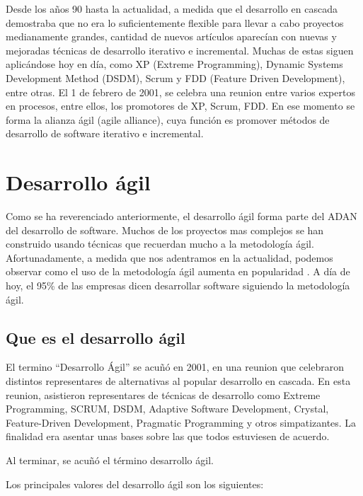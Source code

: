 \documentclass[12pt]{report} %
\begin{document}
Desde los años 90 hasta la actualidad, a medida que el desarrollo en cascada demostraba que no era lo suficientemente flexible para llevar a cabo proyectos medianamente grandes, cantidad de nuevos artículos aparecían con nuevas y mejoradas técnicas de desarrollo iterativo e incremental.
Muchas de estas siguen aplicándose hoy en día, como XP (Extreme Programming), Dynamic Systems Development Method (DSDM), Scrum y FDD (Feature Driven Development), entre otras.
El 1 de febrero de 2001, se celebra una reunion entre varios expertos en procesos, entre ellos, los promotores de XP, Scrum, FDD. 
En ese momento se forma la alianza ágil (agile alliance), cuya función es promover métodos de desarrollo de software iterativo e incremental. 

\section{Desarrollo ágil}

Como se ha reverenciado anteriormente, el desarrollo ágil forma parte del ADAN del desarrollo de software.
Muchos de los proyectos mas complejos se han construido usando técnicas que recuerdan mucho a la metodología ágil. \cite{GW-PM}
Afortunadamente, a medida que nos adentramos en la actualidad, podemos observar como el uso de la metodología ágil aumenta en popularidad \cite{Hoyada}.
A día de hoy, el 95\% de las empresas dicen desarrollar software siguiendo la metodología ágil. \cite{stateofagile}

\subsection{Que es el desarrollo ágil}

El termino ``Desarrollo Ágil'' se acuñó en 2001, en una reunion que celebraron distintos representares de alternativas al popular desarrollo en cascada.
En esta reunion, asistieron representares de técnicas de desarrollo como Extreme Programming, SCRUM, DSDM, Adaptive Software Development, Crystal, Feature-Driven Development, Pragmatic Programming y otros simpatizantes.
La finalidad era asentar unas bases sobre las que todos estuviesen de acuerdo.

Al terminar, se acuñó el término desarrollo ágil.

Los principales valores del desarrollo ágil son los siguientes: \cite{agilePrinciples}
\end{document}
